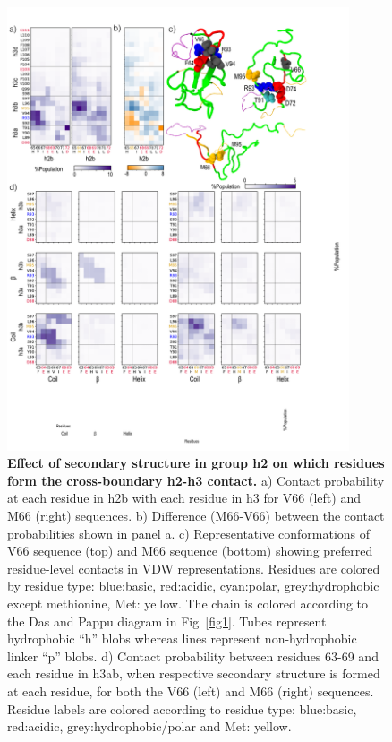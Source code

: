 \documentclass[10pt,letterpaper]{article}
\begin{document}
\begin{figure}[!ht]
\includegraphics[scale=0.5,width=0.9\textwidth,trim={0 0cm 0 0cm},clip]{./figures/fig7.pdf}
\caption{{\bf Effect of secondary structure in group h2 on which residues form the cross-boundary h2-h3 contact.} a) Contact probability at each residue in h2b with each residue in h3 for V66 (left) and M66 (right) sequences. b) Difference (M66-V66) between the contact probabilities shown in panel a. c) Representative conformations of V66 sequence (top) and M66 sequence (bottom) showing preferred residue-level contacts in VDW representations. Residues are colored by residue type: blue:basic, red:acidic, cyan:polar, grey:hydrophobic except methionine, Met: yellow. The chain is colored according to the Das and Pappu diagram in Fig~\ref{fig1}. Tubes represent hydrophobic ``h'' blobs whereas lines represent non-hydrophobic linker ``p'' blobs. d) Contact probability between residues 63-69 and each residue in h3ab, when respective secondary structure is formed at each residue, for both the V66 (left) and M66 (right) sequences. Residue labels are colored according to residue type: blue:basic, red:acidic, grey:hydrophobic/polar and Met: yellow.}
\label{fig7}
\end{figure}
\end{document}
